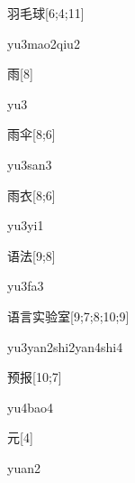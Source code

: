 \begin{verbete}{羽毛球}[6;4;11]
\begin{pronuncia}{yu3mao2qiu2}
\end{pronuncia}
\end{verbete}

\begin{verbete}[yu3]{雨}[8]
\begin{pronuncia}{yu3}
\end{pronuncia}
\end{verbete}

\begin{verbete}[yu3san3]{雨伞}[8;6]
\begin{pronuncia}{yu3san3}
\end{pronuncia}
\end{verbete}

\begin{verbete}[yu3yi1]{雨衣}[8;6]
\begin{pronuncia}{yu3yi1}
\end{pronuncia}
\end{verbete}

\begin{verbete}[yu3fa3]{语法}[9;8]
\begin{pronuncia}{yu3fa3}
\end{pronuncia}
\end{verbete}

\begin{verbete}{语言实验室}[9;7;8;10;9]
\begin{pronuncia}[\\]{yu3yan2shi2yan4shi4}
\end{pronuncia}
\end{verbete}

\begin{verbete}[yu4bao4]{预报}[10;7]
\begin{pronuncia}{yu4bao4}
\end{pronuncia}
\end{verbete}

\begin{verbete}[yuan2]{元}[4]
\begin{pronuncia}{yuan2}
\end{pronuncia}
\end{verbete}

